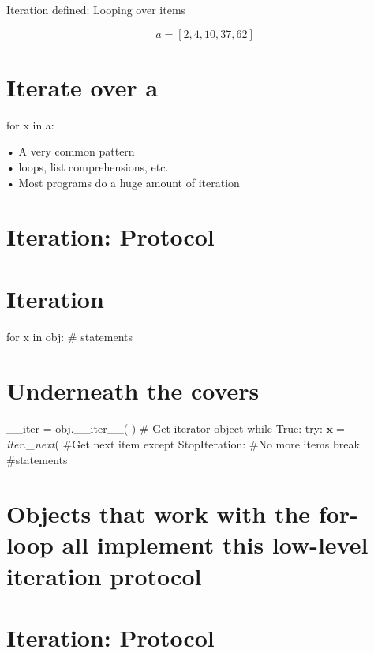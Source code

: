 \documentclass[
  letterpaper,
  DIV=11,
  numbers=noendperiod]{scrreprt}
\begin{document}
Iteration defined: Looping over items

\[
a = [ 2, 4, 1 0, 3 7, 6 2 ]
\]


\chapter{Iterate over a}\label{iterate-over-a}

for x in a:

• A very common pattern\\
• loops, list comprehensions, etc.\\
• Most programs do a huge amount of iteration


\chapter{Iteration: Protocol}\label{iteration-protocol}


\chapter{Iteration}\label{iteration-2}

for x in obj: \# statements


\chapter{Underneath the covers}\label{underneath-the-covers}

\_\_iter = obj.\_\_iter\_\_( ) \# Get iterator object while True: try:
\(\mathbf{x} =\) \emph{iter.\_next}( \#Get next item except
StopIteration: \#No more items break \#statements


\chapter{Objects that work with the for-loop all implement this
low-level iteration
protocol}\label{objects-that-work-with-the-for-loop-all-implement-this-low-level-iteration-protocol}


\chapter{Iteration: Protocol}\label{iteration-protocol-1}
\end{document}
